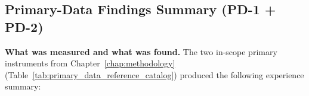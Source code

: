 \subsection{Primary-Data Findings Summary (PD-1 + PD-2)}
\label{sec:ch4_primary_findings_summary}

\noindent\textbf{What was measured and what was found.} The two in-scope primary instruments from Chapter~\ref{chap:methodology} (Table~\ref{tab:primary_data_reference_catalog}) produced the following experience summary:

